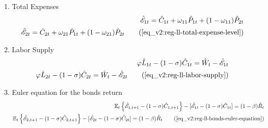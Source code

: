 \documentclass[../thesis.tex]{subfiles}
\begin{document}
{\begin{enumerate}
		
		\begin{comment}
			\item Regional Levels of Consumption and Prices
			\begin{align}
				\hat{C}_{1 1 t} - \hat{C}_{1 2 t} = \hat{P}_{2 t} - \hat{P}_{1 t} \nonumber \\
				\hat{C}_{2 1 t} - \hat{C}_{2 2 t} = \hat{P}_{2 t} - \hat{P}_{1 t} \tag{\ref{eq_v2:reg-ll-regional-consumption-and-prices}}
			\end{align}
		\end{comment}
	

		
		\item Total Expenses
		\begin{align}
			\hat{\mathscr{E}}_{1 t} = \hat{C}_{1 t} + \omega_{1 1} \hat{P}_{1 t} + (1 -\omega_{1 1}) \hat{P}_{2 t} \nonumber \\
			\hat{\mathscr{E}}_{2 t} = \hat{C}_{2 t} + \omega_{2 1} \hat{P}_{1 t} + (1 -\omega_{2 1}) \hat{P}_{2 t} \tag{\ref{eq_v2:reg-ll-total-expense-level}}
		\end{align}
		
		\item Labor Supply
		\begin{alignat}{2}
			\varphi \hat{L}_{1 t} - (1 -\sigma) \hat{C}_{1 t} = \hat{W}_t - \hat{ \mathscr{E} }_{1 t} \nonumber \\
			\varphi \hat{L}_{2 t} - (1 -\sigma) \hat{C}_{2 t} = \hat{W}_t - \hat{ \mathscr{E} }_{2 t} \tag{\ref{eq_v2:reg-ll-labor-supply}}
		\end{alignat}
		
		\item Euler equation for the bonds return
		\begin{alignat}{2}
			\E \left\{ \hat{\mathscr{E}}_{1, t+1} - (1 -\sigma)\hat{C}_{1, t+1} \right\} - [\hat{\mathscr{E}}_{1 t} - (1 -\sigma)\hat{C}_{1 t}] = (1 -\beta) \hat{R}_{t} \nonumber \\ %
			\E \left\{ \hat{\mathscr{E}}_{2, t+1} - (1 -\sigma)\hat{C}_{2, t+1} \right\} - [\hat{\mathscr{E}}_{2 t} - (1 -\sigma)\hat{C}_{2 t}] = (1 -\beta) \hat{R}_{t} \tag{\ref{eq_v2:reg-ll-bonds-euler-equation}} %
		\end{alignat}
		

\end{enumerate}}
\end{document}
